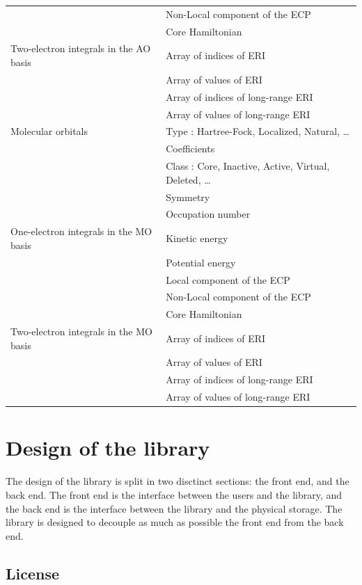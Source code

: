 \begin{longtable}{|l|l|}
 & Non-Local component of the ECP \\
 & Core Hamiltonian \\
\hline
  Two-electron integrals in the AO basis 
 & Array of indices of \ac{ERI} \\
 & Array of values of \ac{ERI}  \\
 & Array of indices of long-range \ac{ERI} \\
 & Array of values of long-range \ac{ERI}  \\
\hline
Molecular orbitals
 & Type : Hartree-Fock, Localized, Natural, \dots \\
 & Coefficients \\
 & Class : Core, Inactive, Active, Virtual, Deleted, \dots \\
 & Symmetry \\
 & Occupation number \\
\hline
  One-electron integrals in the MO basis 
 & Kinetic energy \\
 & Potential energy \\
 & Local component of the ECP \\
 & Non-Local component of the ECP \\
 & Core Hamiltonian \\
\hline
  Two-electron integrals in the MO basis 
 & Array of indices of \ac{ERI} \\
 & Array of values of \ac{ERI}  \\
 & Array of indices of long-range \ac{ERI} \\
 & Array of values of long-range \ac{ERI}  \\
\hline
\end{longtable}



\section{Design of the library}

The design of the library is split in two disctinct sections: the
front end, and the back end. The front end is the interface between
the users and the library, and the back end is the interface between
the library and the physical storage. The library is designed to
decouple as much as possible the front end from the back end.

\subsection{License}

